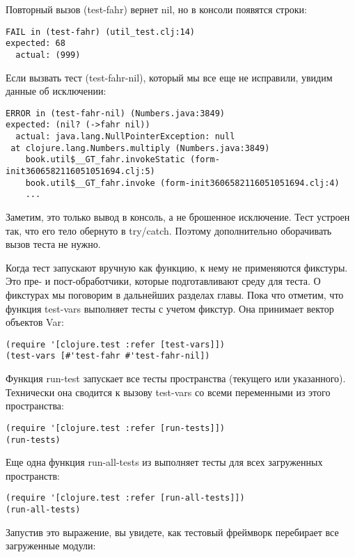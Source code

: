 Повторный вызов (test-fahr) вернет nil, но в консоли появятся строки:

\begin{verbatim}
FAIL in (test-fahr) (util_test.clj:14)
expected: 68
  actual: (999)
\end{verbatim}

Если вызвать тест (test-fahr-nil), который мы все еще не исправили, увидим
данные об исключении:

\begin{verbatim}
ERROR in (test-fahr-nil) (Numbers.java:3849)
expected: (nil? (->fahr nil))
  actual: java.lang.NullPointerException: null
 at clojure.lang.Numbers.multiply (Numbers.java:3849)
    book.util$__GT_fahr.invokeStatic (form-init3606582116051051694.clj:5)
    book.util$__GT_fahr.invoke (form-init3606582116051051694.clj:4)
    ...
\end{verbatim}

Заметим, это только вывод в консоль, а не брошенное исключение. Тест устроен
так, что его тело обернуто в try/catch. Поэтому дополнительно оборачивать вызов
теста не нужно.

Когда тест запускают вручную как функцию, к нему не применяются фикстуры. Это
пре- и пост-обработчики, которые подготавливают среду для теста. О фикстурах мы
поговорим в дальнейших разделах главы. Пока что отметим, что функция test-vars
выполняет тесты с учетом фикстур. Она принимает вектор объектов Var:

\begin{verbatim}
(require '[clojure.test :refer [test-vars]])
(test-vars [#'test-fahr #'test-fahr-nil])
\end{verbatim}

Функция run-test запускает все тесты пространства (текущего или
указанного). Технически она сводится к вызову test-vars со всеми переменными из
этого пространства:

\begin{verbatim}
(require '[clojure.test :refer [run-tests]])
(run-tests)
\end{verbatim}

Еще одна функция run-all-tests из выполняет тесты для всех загруженных
пространств:

\begin{verbatim}
(require '[clojure.test :refer [run-all-tests]])
(run-all-tests)
\end{verbatim}

Запустив это выражение, вы увидете, как тестовый фреймворк перебирает все
загруженные модули:

